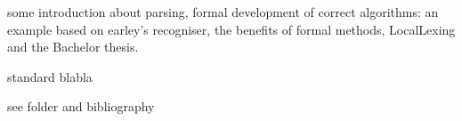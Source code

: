 %
\begin{isabellebody}%
%
%
\isadelimtheory
%
\endisadelimtheory
%
\isatagtheory
%
\endisatagtheory
{\isafoldtheory}%
%
\isadelimtheory
%
\endisadelimtheory
%
\isadelimdocument
%
\endisadelimdocument
%
\isatagdocument
%
\isamarkuptrue%
%
\endisatagdocument
{\isafolddocument}%
%
\isadelimdocument
%
\endisadelimdocument
%
\begin{isamarkuptext}%
%
\end{isamarkuptext}\isamarkuptrue%
%
\begin{isamarkuptext}%
%
\end{isamarkuptext}\isamarkuptrue%
%
\isadelimdocument
%
\endisadelimdocument
%
\isatagdocument
%
\isamarkuptrue%
%
\endisatagdocument
{\isafolddocument}%
%
\isadelimdocument
%
\endisadelimdocument
%
\begin{isamarkuptext}%
some introduction about parsing, formal development of correct algorithms: an example based on
earley's recogniser, the benefits of formal methods, LocalLexing and the Bachelor thesis.%
\end{isamarkuptext}\isamarkuptrue%
%
\isadelimdocument
%
\endisadelimdocument
%
\isatagdocument
%
\isamarkuptrue%
%
\endisatagdocument
{\isafolddocument}%
%
\isadelimdocument
%
\endisadelimdocument
%
\begin{isamarkuptext}%
standard blabla%
\end{isamarkuptext}\isamarkuptrue%
%
\isadelimdocument
%
\endisadelimdocument
%
\isatagdocument
%
\isamarkuptrue%
%
\endisatagdocument
{\isafolddocument}%
%
\isadelimdocument
%
\endisadelimdocument
%
\begin{isamarkuptext}%
see folder and bibliography%
\end{isamarkuptext}\isamarkuptrue%
%
\isadelimdocument
%
\endisadelimdocument

\end{isabellebody}
